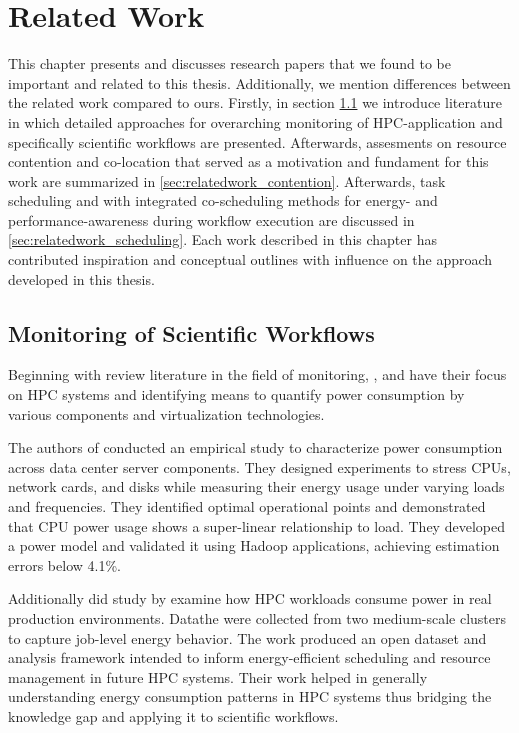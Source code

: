 \section{Related Work}
\label{cha:relatedwork}
This chapter presents and discusses research papers that we found to be important and related to this thesis. Additionally, we mention differences between the related work compared to ours.
Firstly, in section \ref{sec:relatedwork_monitoring} we introduce literature in which detailed approaches for overarching monitoring of HPC-application and specifically scientific workflows are presented.
Afterwards, assesments on resource contention and co-location that served as a motivation and fundament for this work are summarized in \ref{sec:relatedwork_contention}. Afterwards, task scheduling and with integrated co-scheduling methods for energy- and performance-awareness during workflow execution are discussed in \ref{sec:relatedwork_scheduling}.
Each work described in this chapter has contributed inspiration and conceptual outlines with influence on the approach developed in this thesis.

\subsection{Monitoring of Scientific Workflows}
\label{sec:relatedwork_monitoring}

Beginning with review literature in the field of monitoring, \cite{7274318}, \cite{9139801} and \cite{9653557}
have their focus on HPC systems and identifying means to quantify power consumption by various components and virtualization technologies.

The authors of \cite{7274318} conducted an empirical study to characterize power consumption across data center server components. They designed experiments to stress CPUs, network cards, and disks while measuring their energy usage under varying loads and frequencies. They identified optimal operational points and demonstrated that CPU power usage shows a super-linear relationship to load. They developed a power model and validated it using Hadoop applications, achieving estimation errors below 4.1\%.

Additionally did study by \cite{9139801} examine how HPC workloads consume power in real production environments. Datathe  were collected from two medium-scale clusters to capture job-level energy behavior. The work produced an open dataset and analysis framework intended to inform energy-efficient scheduling and resource management in future HPC systems. Their work helped in generally understanding energy consumption patterns in HPC systems thus bridging the knowledge gap and applying it to scientific workflows.


